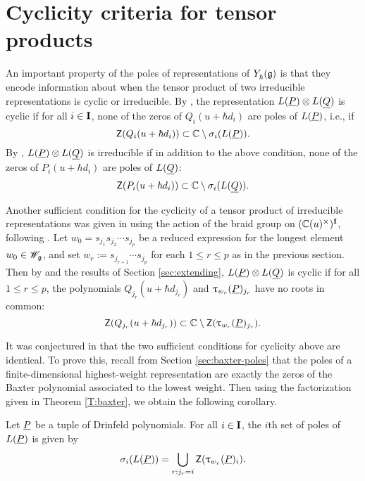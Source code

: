 \section{Cyclicity criteria for tensor products}

An important property of the poles of representations of $Y_\hbar^{}(\mathfrak{g})$ is that they encode information about when the tensor product of two irreducible representations is cyclic or irreducible.
By \cite[Thm. 7.2]{gautam_poles_2023}, the representation $L(\underline{P})\otimes L(\underline{Q})$ is cyclic if for all $i\in\mathbf{I}$, none of the zeros of $Q_i(u+\hbar d_i)$ are poles of $L(\underline{P})$, i.e., if
\[\mathsf{Z}(Q_i(u+\hbar d_i)) \subset \mathbb{C}\setminus\sigma_i(L(\underline{P})).\]
By \cite[Cor. 7.3]{gautam_poles_2023}, $L(\underline{P})\otimes L(\underline{Q})$ is irreducible if in addition to the above condition, none of the zeros of $P_i(u+\hbar d_i)$ are poles of $L(\underline{Q})$:
\[\mathsf{Z}(P_i(u+\hbar d_i)) \subset \mathbb{C}\setminus\sigma_i(L(\underline{Q})).\]

Another sufficient condition for the cyclicity of a tensor product of irreducible representations was given in \cite[Thm. 4.8]{tan_braid_2015} using the action of the braid group on $(\mathbb{C}(u)^\times)^{\mathbf{I}}$, following \cite{chari_braid_2002}.
Let $w_0 = s_{j_1}s_{j_2}\cdots s_{j_p}$ be a reduced expression for the longest element $w_0\in\mathscr{W}_{\mathfrak{g}}$, and set $w_r := s_{j_{r+1}}\cdots s_{j_p}$ for each $1\leq r\leq p$ as in the previous section.
Then by \cite[Thm. 4.8]{tan_braid_2015} and the results of Section \ref{sec:extending}, $L(\underline{P})\otimes L(\underline{Q})$ is cyclic if for all $1\leq r\leq p$, the polynomials $Q_{j_r}(u+\hbar d_{j_r})$ and $\uptau_{w_r}(\underline{P})_{j_r}$ have no roots in common:
\[\mathsf{Z}(Q_{j_r}(u+\hbar d_{j_r})) \subset \mathbb{C}\setminus\mathsf{Z}(\uptau_{w_r}(\underline{P})_{j_r}).\]

It was conjectured in \cite[\S 7.5]{gautam_poles_2023} that the two sufficient conditions for cyclicity above are identical.
To prove this, recall from Section \ref{sec:baxter-poles} that the poles of a finite-dimensional highest-weight representation are exactly the zeros of the Baxter polynomial associated to the lowest weight.
Then using the factorization given in Theorem \ref{T:baxter}, we obtain the following corollary.

\begin{corollary}\label{C:baxter-poles}
    Let $\underline{P}$ be a tuple of Drinfeld polynomials.
    For all $i\in\mathbf{I}$, the $i$th set of poles of $L(\underline{P})$ is given by
    \[\sigma_i(L(\underline{P})) = \bigcup_{r:j_r=i}\mathsf{Z}(\uptau_{w_r}(\underline{P})_i).\]
\end{corollary}

